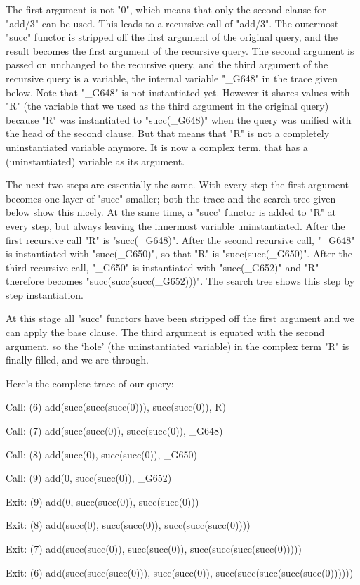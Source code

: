 The first argument is not "0", which means that only the second clause
for "add/3" can be used. This leads to a recursive call of "add/3". The
outermost "succ" functor is stripped off the first argument of the
original query, and the result becomes the first argument of the
recursive query. The second argument is passed on unchanged to the
recursive query, and the third argument of the recursive query is a
variable, the internal variable "_G648" in the trace given below. Note
that "_G648" is not instantiated yet. However it shares values with
"R" (the variable that we used as the third argument in the original
query) because "R" was instantiated to "succ(_G648)" when the query
was unified with the head of the second clause. But that means that
"R" is not a completely uninstantiated variable anymore. It is now a
complex term, that has a (uninstantiated) variable as its argument.

The next two steps are essentially the same. With every step the first
argument becomes one layer of "succ" smaller; both the trace and the
search tree given below show this nicely.  At the same time, a "succ"
functor is added to "R" at every step, but always leaving
the innermost variable uninstantiated. After the first recursive
call "R" is "succ(_G648)".  After the second recursive call, "_G648"
is instantiated with "succ(_G650)", so that "R" is "succ(succ(_G650)".
After the third recursive call, "_G650" is instantiated with
"succ(_G652)" and "R" therefore becomes "succ(succ(succ(_G652)))". The
search tree shows this step by step instantiation.

At this stage all "succ" functors have been stripped off the first
argument and we can apply the base clause. The third argument is
equated with the second argument, so the  `hole' (the
uninstantiated variable) in the complex term "R" is finally filled,
and we are through.

Here's the complete trace of our query:
\begin{LPNcodedisplay}
Call: (6) add(succ(succ(succ(0))), succ(succ(0)), R)

Call: (7) add(succ(succ(0)), succ(succ(0)), _G648)

Call: (8) add(succ(0), succ(succ(0)), _G650)

Call: (9) add(0, succ(succ(0)), _G652)

Exit: (9) add(0, succ(succ(0)), succ(succ(0)))

Exit: (8) add(succ(0), succ(succ(0)), succ(succ(succ(0))))

Exit: (7) add(succ(succ(0)), succ(succ(0)),
                                succ(succ(succ(succ(0)))))

Exit: (6) add(succ(succ(succ(0))), succ(succ(0)),
                          succ(succ(succ(succ(succ(0))))))
\end{LPNcodedisplay}

